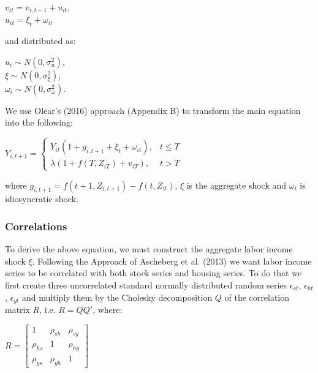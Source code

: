 \documentclass[]{elsarticle}
\begin{document}
\begin{center}
	$v_{it} = v_{i,t-1} + u_{it}$,\\
	$u_{it} = \xi_t + \omega_{it}$
\end{center}

and distributed as:

\begin{center}
	$u_{i} \sim N(0, \sigma^2_u)$,\\
	$\xi \sim N(0,\sigma^2_{\xi})$,\\
	$\omega_{i} \sim N(0, \sigma^2_{\omega})$.
\end{center}

We use Olear's (2016) approach (Appendix B) to transform the main equation into the following:

\begin{center}
	$Y_{i,t+1} = 
	\begin{cases}
		Y_{it} (1 + g_{i,t+1} + \xi_t + \omega_{it}), & t \leq T \\
		\lambda (1 + f(T, Z_{iT}) + v_{iT}), & t > T
	\end{cases}	
	$
\end{center}

where $g_{i,t+1} = f(t+1, Z_{i,t+1}) - f(t, Z_{it})$, $\xi$ is the aggregate shock and $\omega_{i}$ is idiosyncratic shock.


\subsubsection{Correlations}

To derive the above equation, we must construct the aggregate labor income shock $\xi$. Following the Approach of Ascheberg et al. (2013) we want labor income series to be correlated with both stock series and housing series. To do that we first create three uncorrelated standard normally distributed random series $\epsilon_{st}$, $\epsilon_{ht}$, $\epsilon_{yt}$ and multiply them by the Cholesky decomposition $Q$ of the correlation matrix $R$, i.e. $R = QQ'$, where:

\begin{center}
	$R = \begin{bmatrix}
					1 & \rho_{sh} & \rho_{sy} \\
					\rho_{hs} & 1 & \rho_{hy} \\
					\rho_{ys} & \rho_{yh} & 1
			\end{bmatrix}
	$
\end{center}
\end{document}
